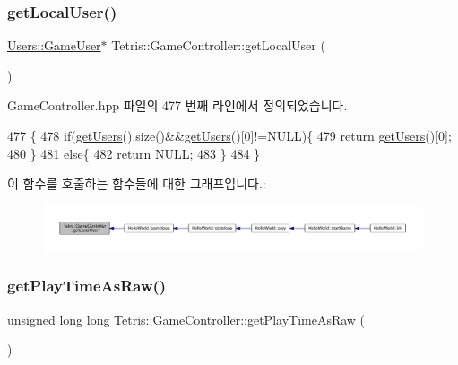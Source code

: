 \subsubsection{\texorpdfstring{get\+Local\+User()}{getLocalUser()}}
{\footnotesize\ttfamily \hyperlink{class_tetris_1_1_users_1_1_game_user}{Users\+::\+Game\+User}$\ast$ Tetris\+::\+Game\+Controller\+::get\+Local\+User (\begin{DoxyParamCaption}{ }\end{DoxyParamCaption})\hspace{0.3cm}{\ttfamily [inline]}}



Game\+Controller.\+hpp 파일의 477 번째 라인에서 정의되었습니다.


\begin{DoxyCode}
477                                      \{
478             \textcolor{keywordflow}{if}(\hyperlink{class_tetris_1_1_game_controller_aa3c2d1f1b5539576116833526478355a}{getUsers}().size()&&\hyperlink{class_tetris_1_1_game_controller_aa3c2d1f1b5539576116833526478355a}{getUsers}()[0]!=NULL)\{
479                 \textcolor{keywordflow}{return} \hyperlink{class_tetris_1_1_game_controller_aa3c2d1f1b5539576116833526478355a}{getUsers}()[0];
480             \}
481             \textcolor{keywordflow}{else}\{
482                 \textcolor{keywordflow}{return} NULL;
483             \}
484         \}
\end{DoxyCode}
이 함수를 호출하는 함수들에 대한 그래프입니다.\+:
\nopagebreak
\begin{figure}[H]
\begin{center}
\leavevmode
\includegraphics[width=350pt]{db/dd2/class_tetris_1_1_game_controller_abc67d4b309ce2886b43a3b4e0af22abc_icgraph}
\end{center}
\end{figure}
\mbox{\label{class_tetris_1_1_game_controller_afce7f1fc500acedd99636b837f9bccf4}} 
\subsubsection{\texorpdfstring{get\+Play\+Time\+As\+Raw()}{getPlayTimeAsRaw()}}
{\footnotesize\ttfamily unsigned long long Tetris\+::\+Game\+Controller\+::get\+Play\+Time\+As\+Raw (\begin{DoxyParamCaption}{ }\end{DoxyParamCaption})\hspace{0.3cm}{\ttfamily [inline]}}

